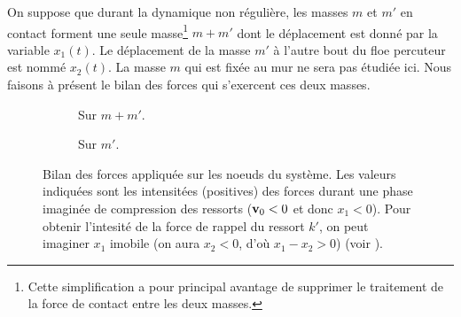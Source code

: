 \noindent On suppose que durant la dynamique non régulière, les masses $m$ et $m'$ en contact forment une seule masse\footnote{Cette simplification a pour principal avantage de supprimer le traitement de la force de contact entre les deux masses.}
$m+m'$ dont
le déplacement est donné par la variable $x_1(t)$. Le déplacement de la masse $m'$ à l'autre bout du floe percuteur est nommé
$x_2(t)$. La masse $m$ qui est fixée au mur ne sera pas étudiée ici. Nous faisons à présent le bilan des forces qui
s'exercent ces
deux masses.
\begin{figure}[!h]
     \begin{subfigure}[b]{0.4\textwidth}
         \centering
         \caption{Sur $m+m'$.}
         \label{fig:bilan11}
     \end{subfigure}
     \begin{subfigure}[b]{0.3\textwidth}
         \centering
         \caption{Sur $m'$.}
         \label{fig:bilan12}
     \end{subfigure}
        \caption{Bilan des forces appliquée sur les noeuds du système. Les valeurs indiquées sont les intensitées
            (positives) des forces durant une phase imaginée de compression des ressorts ($\bm{\mathrm{v}}_0 <0$ et donc
            $x_1 <0$). Pour obtenir l'intesité de la force de rappel du ressort $k'$, on peut imaginer $x_1$ imobile
            (on aura $x_2 < 0$, d'où $x_1 - x_2 > 0$) (voir \parencite{homodeling}).}
        \label{fig:bilan}
\end{figure}

